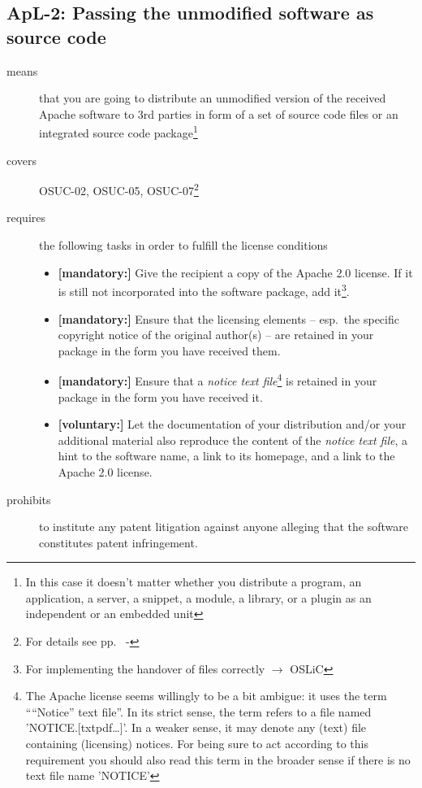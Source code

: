 \subsection{ApL-2: Passing the unmodified software as source code}
\label{OSUC-02-Apache20} \label{OSUC-05-Apache20} \label{OSUC-07-Apache20} 

\begin{description}
\item[means] that you are going to distribute an unmodified version of the
received Apache software to 3rd parties in form of a set of source code files or
an integrated source code package\footnote{In this case it doesn't matter
whether you  distribute a program, an application, a server, a snippet, a
module, a library, or a plugin as an independent or an embedded unit}

\item[covers] OSUC-02, OSUC-05, OSUC-07\footnote{For details see pp.\ 
\pageref{OSUC-02-DEF} - \pageref{OSUC-07-DEF}}

\item[requires] the following tasks in order to fulfill the license conditions
\begin{itemize}
  \item \textbf{[mandatory:]} Give the recipient a copy of the Apache 2.0
  license. If it is still not incorporated into the software package, add
  it\footnote{For implementing the handover of files correctly $\rightarrow$
  OSLiC \pageref{DistributingFilesHint}}.
  \item \textbf{[mandatory:]} Ensure that the licensing elements -- esp.\ the
  specific copyright notice of the original author(s) -- are retained in your
  package in the form you have received them.
  \item \textbf{[mandatory:]} Ensure that a \emph{notice text file}\footnote{
  The Apache license seems willingly to be a bit ambigue: it uses the term
  \enquote{``Notice'' text file}. In its strict sense, the term refers to a file
  named 'NOTICE.[txt\textbar{}pdf\textbar{}\ldots]'. In a weaker sense, it may
  denote any (text) file containing (licensing) notices. For being sure to act
  according to this requirement you should also read this term in the broader
  sense if there is no text file name 'NOTICE'} is retained in your package in
  the form you have received it.
  
  \item \textbf{[voluntary:]} Let the documentation of your distribution and/or
  your additional material also reproduce the content of the \emph{notice text
  file}, a hint to the software name, a link to its homepage, and a link to the
  Apache 2.0 license.
\end{itemize}

\item[prohibits] to institute any patent litigation against anyone alleging that
the software constitutes patent infringement.

\end{description}



